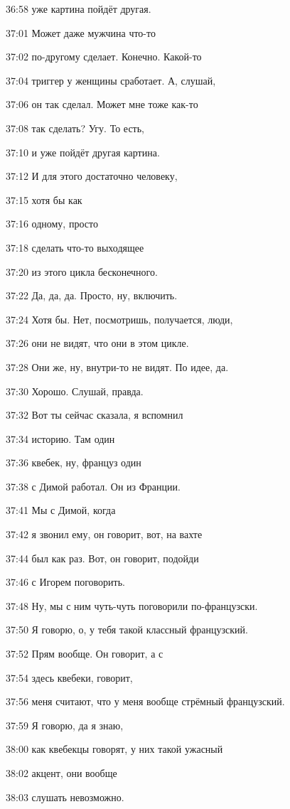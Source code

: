 36:58
уже картина пойдёт другая.

37:01
Может даже мужчина что-то

37:02
по-другому сделает. Конечно. Какой-то

37:04
триггер у женщины сработает. А, слушай,

37:06
он так сделал. Может мне тоже как-то

37:08
так сделать? Угу. То есть,

37:10
и уже пойдёт другая картина.

37:12
И для этого достаточно человеку,

37:15
хотя бы как

37:16
одному, просто

37:18
сделать что-то выходящее

37:20
из этого цикла бесконечного.

37:22
Да, да, да. Просто, ну, включить.

37:24
Хотя бы. Нет, посмотришь, получается, люди,

37:26
они не видят, что они в этом цикле.

37:28
Они же, ну, внутри-то не видят. По идее, да.

37:30
Хорошо. Слушай, правда.

37:32
Вот ты сейчас сказала, я вспомнил

37:34
историю. Там один

37:36
квебек, ну, француз один

37:38
с Димой работал. Он из Франции.

37:41
Мы с Димой, когда

37:42
я звонил ему, он говорит, вот, на вахте

37:44
был как раз. Вот, он говорит, подойди

37:46
с Игорем поговорить.

37:48
Ну, мы с ним чуть-чуть поговорили по-французски.

37:50
Я говорю, о, у тебя такой классный французский.

37:52
Прям вообще. Он говорит, а с

37:54
здесь квебеки, говорит,

37:56
меня считают, что у меня вообще стрёмный французский.

37:59
Я говорю, да я знаю,

38:00
как квебекцы говорят, у них такой ужасный

38:02
акцент, они вообще

38:03
слушать невозможно.

